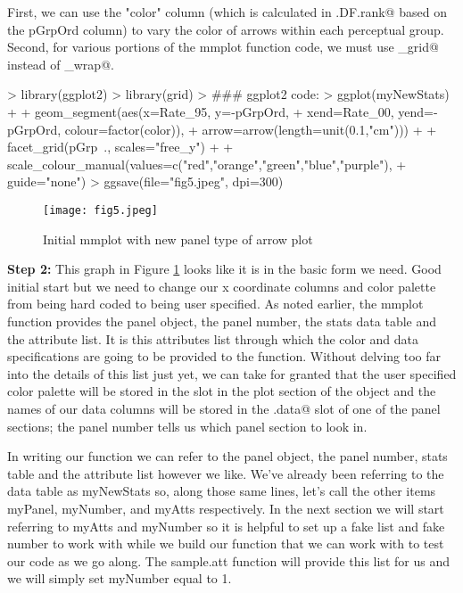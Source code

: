\documentclass{article}
\begin{document}
First, we can use the "color" column (which is calculated in \verb@create.DF.rank@ based on the pGrpOrd column) to vary the color of arrows within each perceptual group. Second, for various portions of the mmplot function code, we must
use \verb@facet_grid@ instead of \verb@facet_wrap@.

\begin{Schunk}
\begin{Sinput}
> library(ggplot2)
> library(grid)
> ### ggplot2 code:
> ggplot(myNewStats) +
+   geom_segment(aes(x=Rate_95, y=-pGrpOrd,
+   xend=Rate_00, yend=-pGrpOrd, colour=factor(color)),
+   arrow=arrow(length=unit(0.1,"cm"))) +
+   facet_grid(pGrp~., scales="free_y") +
+   scale_colour_manual(values=c("red","orange","green","blue","purple"),
+   guide="none")
> ggsave(file="fig5.jpeg", dpi=300)
\end{Sinput}
\end{Schunk}

\begin{figure}
\begin{center}
\texttt{[image: fig5.jpeg]} 
  \caption{Initial mmplot with new panel type of arrow plot} 
  \label{fig5}
\end{center}
\end{figure}

\textbf{Step 2:} This graph in Figure \ref{fig5} looks like it is in the basic form we need. Good initial start but we need to change our x coordinate columns and color palette from being hard coded to being user specified. As noted earlier, the mmplot function provides the panel object, the panel number, the stats data table and the attribute list. It is this attributes list through which the color and data specifications are going to be provided to the function. Without delving too far into the details of this list just yet, we can take for granted that the user
specified color palette will be stored in the \verb@colors@ slot in the plot
section of the object and the names of our data columns will be stored in the \verb@panel.data@ slot of one of the panel sections; the panel number tells us which panel section to look in.

In writing our function we can refer to the panel object, the panel number, stats table and the attribute list however we like. We've already been referring to the data table as myNewStats so, along those same lines, let's call the other items myPanel, myNumber, and myAtts respectively. In the next section we will start referring to myAtts and myNumber so it is helpful to set up a fake list and fake number to work with while we build our function that we can work with to test our code as we go along. The sample.att function will provide this list for us and we will simply set myNumber equal to 1.
\end{document}
